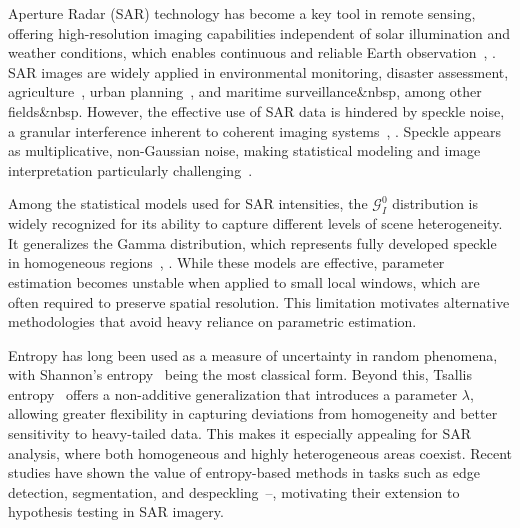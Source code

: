 \documentclass[
  lettersize  journal,
]{IEEEtran}%
\begin{document}
 Aperture Radar (SAR) technology has become a
key tool in remote sensing, offering high-resolution imaging
capabilities independent of solar illumination and weather conditions,
which enables continuous and reliable Earth
observation~,
. SAR images are widely applied in
environmental monitoring, disaster assessment,
agriculture~, urban
planning~,
and maritime
surveillance\&nbsp,
among other fields\&nbsp. However,
the effective use of SAR data is hindered by speckle noise, a granular
interference inherent to coherent imaging
systems~,
. Speckle appears as multiplicative,
non-Gaussian noise, making statistical modeling and image interpretation
particularly challenging~.

Among the statistical models used for SAR intensities, the
\(\mathcal{G}_I^0\) distribution is widely recognized for its ability to
capture different levels of scene heterogeneity. It generalizes the
Gamma distribution, which represents fully developed speckle in
homogeneous regions~,
. While these models are effective,
parameter estimation becomes unstable when applied to small local
windows, which are often required to preserve spatial resolution. This
limitation motivates alternative methodologies that avoid heavy reliance
on parametric estimation.

Entropy has long been used as a measure of uncertainty in random
phenomena, with Shannon's entropy~
being the most classical form. Beyond this, Tsallis
entropy~ offers a non-additive
generalization that introduces a parameter \(\lambda\), allowing greater
flexibility in capturing deviations from homogeneity and better
sensitivity to heavy-tailed data. This makes it especially appealing for
SAR analysis, where both homogeneous and highly heterogeneous areas
coexist. Recent studies have shown the value of entropy-based methods in
tasks such as edge detection, segmentation, and
despeckling~--,
motivating their extension to hypothesis testing in SAR imagery.
\end{document}

